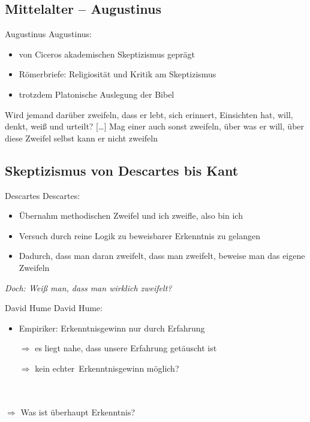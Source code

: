 \documentclass[12pt]{beamer}
\begin{document}
\subsection{Mittelalter – Augustinus}
\begin{frame}{Augustinus}
Augustinus:
\begin{itemize}
\item von Ciceros akademischen Skeptizismus geprägt
\item \glqq Römerbriefe\grqq : Religiosität und Kritik am Skeptizismus
\item trotzdem Platonische Auslegung der Bibel
\end{itemize}
\glqq Wird jemand darüber zweifeln, dass er lebt, sich erinnert, Einsichten hat, will, denkt, weiß und urteilt? [\ldots] Mag einer auch sonst zweifeln, über was er will, über diese Zweifel selbst kann er nicht zweifeln\grqq
\end{frame}
\subsection{Skeptizismus von Descartes bis Kant}
\begin{frame}{Descartes}
Descartes:
\begin{itemize}
\item Übernahm  methodischen Zweifel und  \glqq ich zweifle, also bin ich\grqq
\item Versuch durch reine Logik zu beweisbarer Erkenntnis zu gelangen
\item Dadurch, dass man daran zweifelt, dass man zweifelt, beweise man das eigene Zweifeln
\end{itemize}
\emph{Doch: Weiß man, dass man wirklich zweifelt?}
\end{frame}

\begin{frame}{David Hume}
David Hume:
\begin{itemize}
\item Empiriker: Erkenntnisgewinn nur durch Erfahrung
\item[$\Rightarrow$] es liegt nahe, dass unsere Erfahrung getäuscht ist
\item[$\Rightarrow$] kein \glqq echter\grqq\ Erkenntnisgewinn möglich?
\end{itemize}
\ \\
\ \\
$\Rightarrow$ Was ist überhaupt \glqq Erkenntnis\grqq ?
\end{frame}
\end{document}

